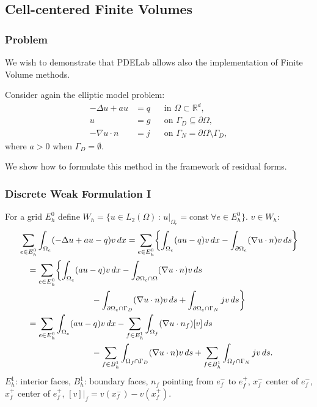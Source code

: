 \subsection{Cell-centered Finite Volumes}

\begin{frame}
\frametitle{Problem}
We wish to demonstrate that PDELab allows also the implementation of Finite Volume methods.

Consider again the elliptic model problem:
\begin{subequations} \label{Eq:Example04}
\begin{align*}
 -\Delta u + a u  &= q &&\text{in $\Omega\subset\mathbb{R}^d$},\\
                u &= g &&\text{on $\Gamma_D\subseteq\partial\Omega$},\\
-\nabla u \cdot n &= j &&\text{on $\Gamma_N=\partial\Omega\setminus\Gamma_D$},
\end{align*}
\end{subequations}
where $a>0$ when $\Gamma_D=\emptyset$.

We show how to formulate this method in the framework of residual forms.
\end{frame}

\begin{frame}
\frametitle{Discrete Weak Formulation I}
For a grid $E_h^0$ define $W_h = \{ u \in L_2(\Omega) \,:\, 
u|_{\Omega_e} = \text{const} \ \forall e\in E_h^0\}$. $v\in W_h$:
\begin{equation*}
\begin{split}
& \sum_{e\in E_h^0} \int_{\Omega_e} (-\Delta u + au - q) v \, dx = 
\sum_{e\in E_h^0} \biggl\{ \int_{\Omega_e} (au - q) v \, dx - 
\int_{\partial\Omega_e} (\nabla u\cdot n) v \, ds \biggr\}\\
&\quad = \sum_{e\in E_h^0} \biggl\{ \int_{\Omega_e} (au - q) v \, dx
- \int_{\partial\Omega_e\cap\Omega} (\nabla u\cdot n) v \, ds\\
&\hspace{30mm} - \int_{\partial\Omega_e\cap\Gamma_D} (\nabla u\cdot n) v \, ds
+ \int_{\partial\Omega_e\cap\Gamma_N} j v \, ds \biggr\}\\
&\quad = \sum_{e\in E_h^0} \int_{\Omega_e} (au - q) v \, dx
- \sum_{f\in E_h^1} \int_{\Omega_f} (\nabla u\cdot n_f) [v] \, ds\\
&\hspace{30mm} - \sum_{f\in B_h^1} \int_{\Omega_f\cap\Gamma_D} (\nabla u\cdot n) v \, ds
+ \sum_{f\in B_h^1} \int_{\Omega_f\cap\Gamma_N} j v \, ds .
\end{split}
\end{equation*}
$E_h^1$: interior faces, $B_h^1$: boundary faces, $n_f$ pointing from $e^-_f$ to $e^+_f$,
$x_f^-$ center of $e_f^-$, $x_f^+$ center of $e_f^+$, $[v]|_f = v(x_f^-) - v(x_f^+)$.
\end{frame}


